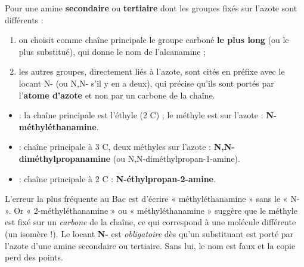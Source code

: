 \documentclass[11pt]{article}
\newcommand{\cle}[1]{{\popxbold\color{popdark}#1}}
\begin{document}
\begin{propriete}
Pour une amine \textbf{secondaire} ou \textbf{tertiaire} dont les groupes fixés sur l'azote sont différents :
\begin{enumerate}
\item on choisit comme chaîne principale le groupe carboné \textbf{le plus long} (ou le plus substitué), qui donne le nom de l'alcanamine ;
\item les autres groupes, directement liés à l'azote, sont cités en préfixe avec le \cle{locant N-} (ou \cle{N,N-} s'il y en a deux), qui précise qu'ils sont portés par l'\textbf{atome d'azote} et non par un carbone de la chaîne.
\end{enumerate}
\end{propriete}

\begin{exemplebox}
\begin{itemize}
\item {} : la chaîne principale est l'éthyle (2 C) ; le méthyle est sur l'azote : \textbf{N-méthyléthanamine}.
\item {} : chaîne principale à 3 C, deux méthyles sur l'azote : \textbf{N,N-diméthylpropanamine} (ou N,N-diméthylpropan-1-amine).
\item {} : chaîne principale à 2 C : \textbf{N-éthylpropan-2-amine}.
\end{itemize}
\end{exemplebox}

\begin{attention}
L'erreur la plus fréquente au Bac est d'écrire « méthyléthanamine » sans le « N- ». Or « 2-méthyléthanamine » ou « méthyléthanamine » suggère que le méthyle est fixé sur un \emph{carbone} de la chaîne, ce qui correspond à une molécule différente (un isomère !). Le locant \textbf{N-} est \emph{obligatoire} dès qu'un substituant est porté par l'azote d'une amine secondaire ou tertiaire. Sans lui, le nom est faux et la copie perd des points.
\end{attention}
\end{document}

